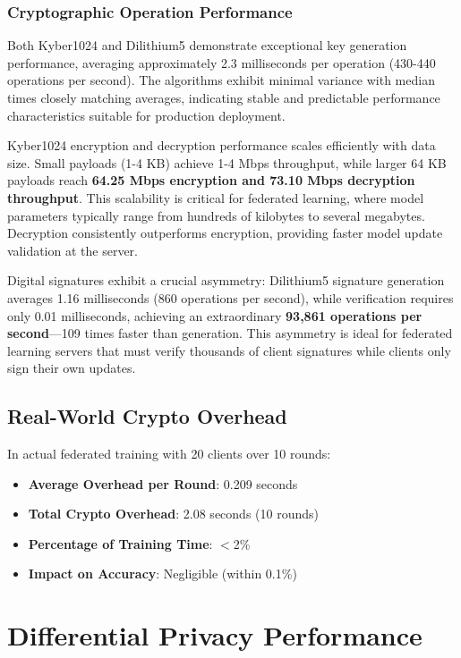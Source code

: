 \documentclass[12pt,a4paper]{article}
\begin{document}
\subsubsection{Cryptographic Operation Performance}

Both Kyber1024 and Dilithium5 demonstrate exceptional key generation performance, averaging approximately 2.3 milliseconds per operation (430-440 operations per second). The algorithms exhibit minimal variance with median times closely matching averages, indicating stable and predictable performance characteristics suitable for production deployment.

Kyber1024 encryption and decryption performance scales efficiently with data size. Small payloads (1-4 KB) achieve 1-4 Mbps throughput, while larger 64 KB payloads reach \textbf{64.25 Mbps encryption and 73.10 Mbps decryption throughput}. This scalability is critical for federated learning, where model parameters typically range from hundreds of kilobytes to several megabytes. Decryption consistently outperforms encryption, providing faster model update validation at the server.

Digital signatures exhibit a crucial asymmetry: Dilithium5 signature generation averages 1.16 milliseconds (860 operations per second), while verification requires only 0.01 milliseconds, achieving an extraordinary \textbf{93,861 operations per second}---109 times faster than generation. This asymmetry is ideal for federated learning servers that must verify thousands of client signatures while clients only sign their own updates.

\subsection{Real-World Crypto Overhead}

In actual federated training with 20 clients over 10 rounds:

\begin{itemize}
    \item \textbf{Average Overhead per Round}: 0.209 seconds
    \item \textbf{Total Crypto Overhead}: 2.08 seconds (10 rounds)
    \item \textbf{Percentage of Training Time}: $<$2\%
    \item \textbf{Impact on Accuracy}: Negligible (within 0.1\%)
\end{itemize}

\section{Differential Privacy Performance}
\end{document}
